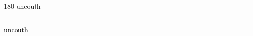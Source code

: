 
\begin{frame}
\begin{center}
\begin{turn}{180}
{\fontsize{2.5cm}{1em}\selectfont uncouth}
\end{turn}
\vspace{1em}\par  
\hrule
\vspace{1em}\par  
{\fontsize{2.5cm}{1em}\selectfont uncouth}
\end{center}
\end{frame}

